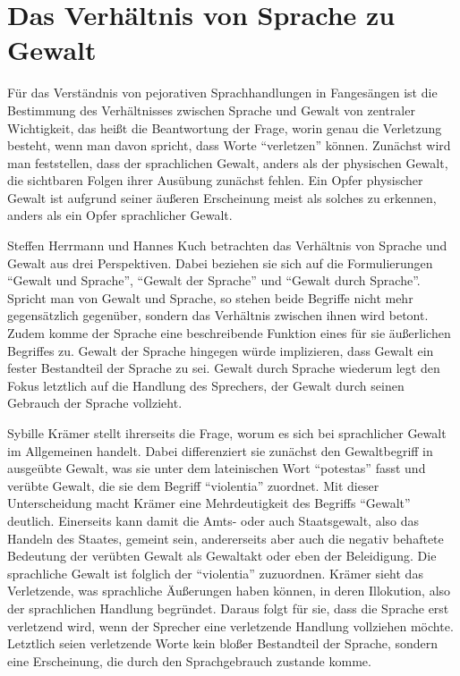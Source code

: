 \section{Das Verhältnis von Sprache zu Gewalt}
Für das Verständnis von pejorativen Sprachhandlungen in Fangesängen ist die Bestimmung des Verhältnisses zwischen Sprache und Gewalt von zentraler Wichtigkeit, das heißt die Beantwortung der Frage, worin genau die Verletzung besteht, wenn man davon spricht, dass Worte "`verletzen"' können.
Zunächst wird man feststellen, dass der sprachlichen Gewalt, anders als der physischen Gewalt, die sichtbaren Folgen ihrer Ausübung zunächst fehlen.
Ein Opfer physischer Gewalt ist aufgrund seiner äußeren Erscheinung meist als solches zu erkennen, anders als ein Opfer sprachlicher Gewalt.

Steffen Herrmann und Hannes Kuch betrachten das Verhältnis von Sprache und Gewalt aus drei Perspektiven.
Dabei beziehen sie sich auf die Formulierungen "`Gewalt und Sprache"', "`Gewalt der Sprache"' und "`Gewalt durch Sprache"'.
Spricht man von Gewalt und Sprache, so stehen beide Begriffe nicht mehr gegensätzlich gegenüber, sondern das Verhältnis zwischen ihnen wird betont.
Zudem komme der Sprache eine beschreibende Funktion eines für sie äußerlichen Begriffes zu.
Gewalt der Sprache hingegen würde implizieren, dass Gewalt ein fester Bestandteil der Sprache zu sei.
Gewalt durch Sprache wiederum legt den Fokus letztlich auf die Handlung des Sprechers, der Gewalt durch seinen Gebrauch der Sprache vollzieht.

Sybille Krämer stellt ihrerseits die Frage, worum es sich bei sprachlicher Gewalt im Allgemeinen handelt.
Dabei differenziert sie zunächst den Gewaltbegriff in ausgeübte Gewalt, was sie unter dem lateinischen Wort "`potestas"' fasst und verübte Gewalt, die sie dem Begriff "`violentia"' zuordnet.
Mit dieser Unterscheidung macht Krämer eine Mehrdeutigkeit des Begriffs "`Gewalt"' deutlich.
Einerseits kann damit die Amts- oder auch Staatsgewalt, also das Handeln des Staates, gemeint sein, andererseits aber auch die negativ behaftete Bedeutung der verübten Gewalt als Gewaltakt oder eben der Beleidigung.
Die sprachliche Gewalt ist folglich der "`violentia"' zuzuordnen.
Krämer sieht das Verletzende, was sprachliche Äußerungen haben können, in deren Illokution, also der sprachlichen Handlung begründet.
Daraus folgt für sie, dass die Sprache erst verletzend wird, wenn der Sprecher eine verletzende Handlung vollziehen möchte.
Letztlich seien verletzende Worte kein bloßer Bestandteil der Sprache, sondern eine Erscheinung, die durch den Sprachgebrauch zustande komme.


